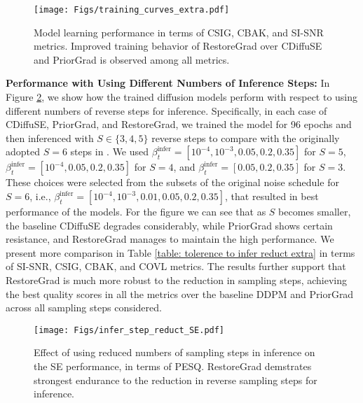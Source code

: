\begin{figure}[!th]
    \centering
    \texttt{[image: Figs/training\_curves\_extra.pdf]}
    \vspace{-0.2cm}
    \caption{Model learning performance in terms of CSIG, CBAK, and SI-SNR metrics. Improved training behavior of RestoreGrad over CDiffuSE and PriorGrad is observed among all metrics.} 
\label{fig: training curves other}
\end{figure}

\vspace{0.2cm}

\noindent\textbf{Performance with Using Different Numbers of Inference Steps:}
In Figure \ref{fig: tolerance to reduced interence sampling steps appendix}, we show how the trained diffusion models perform with respect to using different numbers of reverse steps for inference. Specifically, in each case of CDiffuSE, PriorGrad, and RestoreGrad, we trained the model for 96 epochs and then inferenced with $S\in\{3,4,5\}$ reverse steps to compare with the originally adopted $S=6$ steps in \citet{lu2022conditional}. We used $\beta^{\text{infer}}_t=[10^{-4}, 10^{-3}, 0.05, 0.2, 0.35]$ for $S=5$, $\beta^{\text{infer}}_t=[10^{-4}, 0.05, 0.2, 0.35]$ for $S=4$, and $\beta^{\text{infer}}_t=[0.05, 0.2, 0.35]$ for $S=3$. These choices were selected from the subsets of the original noise schedule for $S=6$, i.e., $\beta^{\text{infer}}_t=[10^{-4}, 10^{-3}, 0.01, 0.05, 0.2, 0.35]$, that resulted in best performance of the models. For the figure we can see that as $S$ becomes smaller, the baseline CDiffuSE degrades considerably, while PriorGrad shows certain resistance, and RestoreGrad manages to maintain the high performance. We present more comparison in Table \ref{table: tolerence to infer reduct extra} in terms of SI-SNR, CSIG, CBAK, and COVL metrics. The results further support that RestoreGrad is much more robust to the reduction in sampling steps, achieving the best quality scores in all the metrics over the baseline DDPM and PriorGrad across all sampling steps considered.

\begin{figure}[!th]
    \centering
    \texttt{[image: Figs/infer\_step\_reduct\_SE.pdf]}
    \vspace{-0.25cm}
    \caption{Effect of using reduced numbers of sampling steps in inference on the SE performance, in terms of PESQ. RestoreGrad demstrates strongest endurance to the reduction in reverse sampling steps for inference.} 
\label{fig: tolerance to reduced interence sampling steps appendix}
\end{figure}

